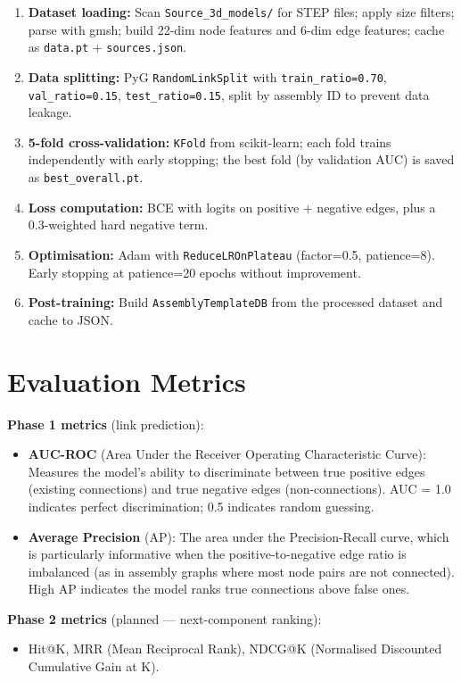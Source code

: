 \documentclass[12pt]{report}
\begin{document}
\begin{enumerate}
    \item \textbf{Dataset loading:} Scan \texttt{Source\_3d\_models/} for STEP files; apply size filters; parse with gmsh; build 22-dim node features and 6-dim edge features; cache as \texttt{data.pt} + \texttt{sources.json}.
    \item \textbf{Data splitting:} PyG \texttt{RandomLinkSplit} with \texttt{train\_ratio=0.70}, \texttt{val\_ratio=0.15}, \texttt{test\_ratio=0.15}, split by assembly ID to prevent data leakage.
    \item \textbf{5-fold cross-validation:} \texttt{KFold} from scikit-learn; each fold trains independently with early stopping; the best fold (by validation AUC) is saved as \texttt{best\_overall.pt}.
    \item \textbf{Loss computation:} BCE with logits on positive + negative edges, plus a 0.3-weighted hard negative term.
    \item \textbf{Optimisation:} Adam with \texttt{ReduceLROnPlateau} (factor=0.5, patience=8). Early stopping at patience=20 epochs without improvement.
    \item \textbf{Post-training:} Build \texttt{AssemblyTemplateDB} from the processed dataset and cache to JSON.
\end{enumerate}

\section{Evaluation Metrics}

\textbf{Phase 1 metrics} (link prediction):

\begin{itemize}
    \item \textbf{AUC-ROC} (Area Under the Receiver Operating Characteristic Curve): Measures the model's ability to discriminate between true positive edges (existing connections) and true negative edges (non-connections). AUC = 1.0 indicates perfect discrimination; 0.5 indicates random guessing.
    \item \textbf{Average Precision} (AP): The area under the Precision-Recall curve, which is particularly informative when the positive-to-negative edge ratio is imbalanced (as in assembly graphs where most node pairs are not connected). High AP indicates the model ranks true connections above false ones.
\end{itemize}

\textbf{Phase 2 metrics} (planned --- next-component ranking):
\begin{itemize}
    \item Hit@K, MRR (Mean Reciprocal Rank), NDCG@K (Normalised Discounted Cumulative Gain at K).
\end{itemize}
\end{document}
